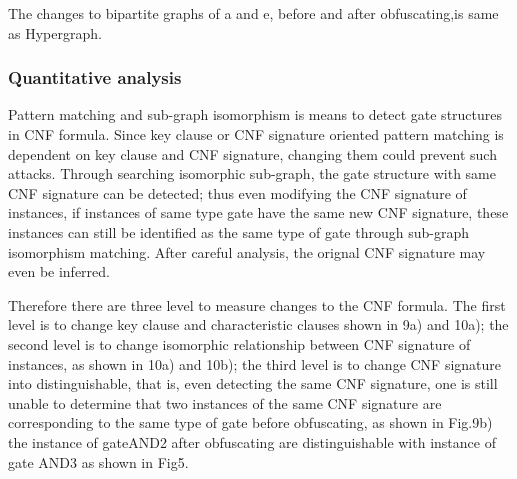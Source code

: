 \documentclass[runningheads,a4paper]{llncs}
\begin{document}
The changes to bipartite graphs of a and e, before and after obfuscating,is same as Hypergraph. 



\subsubsection{Quantitative analysis} 

Pattern matching and sub-graph isomorphism is means to detect gate structures in CNF formula. Since key clause or CNF signature oriented pattern matching is dependent on key clause and CNF signature, changing them could prevent such attacks. Through searching isomorphic sub-graph, the gate structure with same CNF signature can be detected; thus even modifying the CNF signature of instances, if instances of same type gate have the same new CNF signature, these instances can still be identified as the same type of gate through sub-graph isomorphism matching. After careful analysis, the orignal CNF signature may even be inferred. 

Therefore there are three level to measure changes to the CNF formula. The first level is to change key clause and characteristic clauses shown in 9a) and 10a); the second level is to change isomorphic relationship between CNF signature of instances, as shown in 10a) and 10b); the third level is to change CNF signature into distinguishable, that is, even detecting the same CNF signature, one is still unable to determine that two instances of the same CNF signature are corresponding to the same type of gate before obfuscating, as shown in Fig.9b) the instance of gateAND2 after obfuscating are distinguishable with instance of gate AND3 as shown in Fig5.
\end{document}
